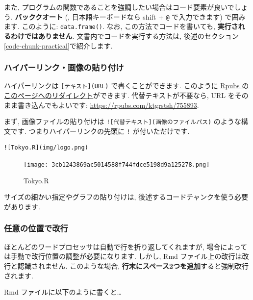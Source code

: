 \documentclass[
]{ltjsarticle}
\begin{document}
また, プログラムの関数であることを強調したい場合はコード要素が良いでしょう. \textbf{バッククオート} (\texttt{\textasciigrave{}}, 日本語キーボードなら shift + \texttt{@} で入力できます) で囲みます. このように: \texttt{data.frame()}. なお, この方法でコードを書いても, \textbf{実行されるわけではありません}. 文書内でコードを実行する方法は, 後述のセクション\ref{code-chunk-practical}で紹介します.

\hypertarget{ux30cfux30a4ux30d1ux30fcux30eaux30f3ux30afux753bux50cfux306eux8cbcux308aux4ed8ux3051}{%
\subsubsection{ハイパーリンク・画像の貼り付け}\label{ux30cfux30a4ux30d1ux30fcux30eaux30f3ux30afux753bux50cfux306eux8cbcux308aux4ed8ux3051}}

ハイパーリンクは \texttt{{[}テキスト{]}(URL)} で書くことができます. このように \href{https://rpubs.com/ktgrstsh/755893}{Rpubs のこのページへのリダイレクト}ができます. 代替テキストが不要なら, URL をそのまま書き込んでもよいです: \url{https://rpubs.com/ktgrstsh/755893}.

まず, 画像ファイルの貼り付けは \texttt{!{[}代替テキスト{]}(画像のファイルパス)} のような構文です. つまりハイパーリンクの先頭に \texttt{!} が付いただけです.

\begin{verbatim}
![Tokyo.R](img/logo.png)
\end{verbatim}

\begin{figure}
\centering
\texttt{[image: 3cb1243869ac5014588f744fdce5198d9a125278.png]}
\caption{Tokyo.R}
\end{figure}

サイズの細かい指定やグラフの貼り付けは, 後述するコードチャンクを使う必要があります.

\hypertarget{ux4efbux610fux306eux4f4dux7f6eux3067ux6539ux884c}{%
\subsubsection{任意の位置で改行}\label{ux4efbux610fux306eux4f4dux7f6eux3067ux6539ux884c}}

ほとんどのワードプロセッサは自動で行を折り返してくれますが, 場合によっては手動で改行位置の調整が必要になります. しかし, Rmd ファイル上の改行は改行と認識されません. このような場合, \textbf{行末にスペース2つを追加}すると強制改行されます.

Rmd ファイルに以下のように書くと\ldots{}
\end{document}
